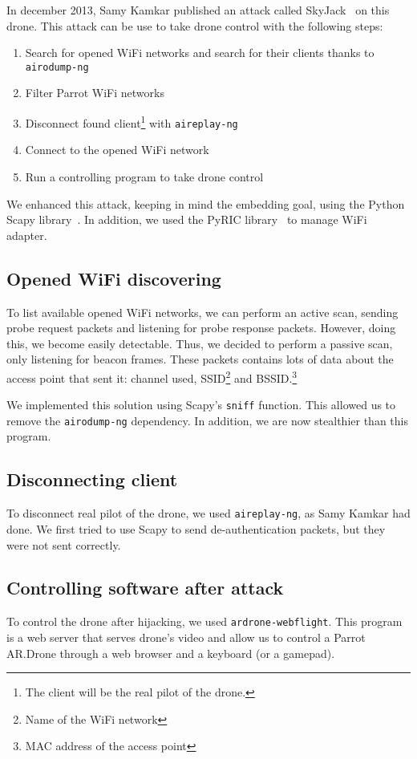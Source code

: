 \documentclass[conference,a4paper]{IEEEtran}
\newcommand{\myv}[1]{\texttt{\small#1}}
\begin{document}
In december 2013, Samy Kamkar published an attack called SkyJack~\cite{bib:skyjack} on
this drone. This attack can be use to take drone control with the following steps:

\begin{enumerate}
  \item Search for opened WiFi networks and search for their clients thanks to
    \myv{airodump-ng}
  \item Filter Parrot WiFi networks
  \item Disconnect found client\footnote{The client will be the real pilot of the drone.}
    with \myv{aireplay-ng}
  \item Connect to the opened WiFi network
  \item Run a controlling program to take drone control
\end{enumerate}

We enhanced this attack, keeping in mind the embedding goal, using the Python Scapy
library~\cite{bib:scapy}. In addition, we used the PyRIC library~\cite{bib:pyric} to
manage WiFi adapter.

\subsection{Opened WiFi discovering}
To list available opened WiFi networks, we can perform an active scan, sending probe
request packets and listening for probe response packets. However, doing this, we become
easily detectable. Thus, we decided to perform a passive scan, only listening for beacon
frames. These packets contains lots of data about the access point that sent it: channel
used, SSID\footnote{Name of the WiFi network} and BSSID.\footnote{MAC address of the access
point}

We implemented this solution using Scapy's \myv{sniff} function. This allowed us to
remove the \myv{airodump-ng} dependency. In addition, we are now stealthier than this
program.

\subsection{Disconnecting client}
To disconnect real pilot of the drone, we used \myv{aireplay-ng}, as Samy Kamkar had
done. We first tried to use Scapy to send de-authentication packets, but they were not sent
correctly.

\subsection{Controlling software after attack}
To control the drone after hijacking, we used \myv{ardrone-webflight}. This program is
a web server that serves drone's video and allow us to control a Parrot AR.Drone through a
web browser and a keyboard (or a gamepad).
\end{document}
